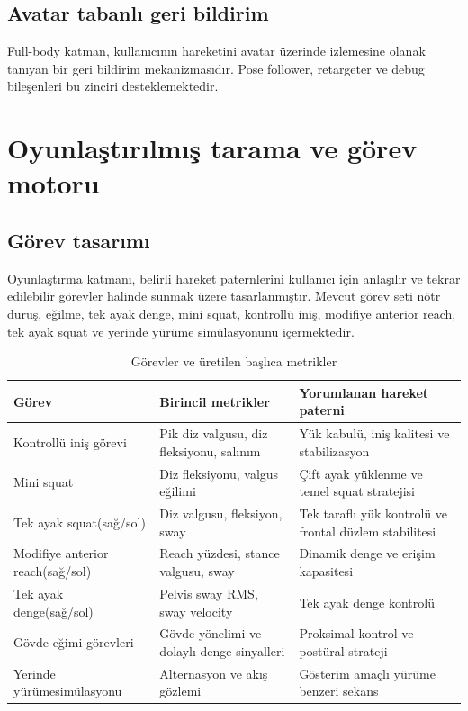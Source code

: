 \documentclass[12pt,a4paper,oneside]{report}
\begin{document}
\subsection{Avatar tabanlı geri bildirim}
Full-body katman, kullanıcının hareketini avatar üzerinde izlemesine olanak tanıyan bir geri bildirim mekanizmasıdır. Pose follower, retargeter ve debug bileşenleri bu zinciri desteklemektedir.

\section{Oyunlaştırılmış tarama ve görev motoru}

\subsection{Görev tasarımı}
Oyunlaştırma katmanı, belirli hareket paternlerini kullanıcı için anlaşılır ve tekrar edilebilir görevler halinde sunmak üzere tasarlanmıştır. Mevcut görev seti nötr duruş, eğilme, tek ayak denge, mini squat, kontrollü iniş, modifiye anterior reach, tek ayak squat ve yerinde yürüme simülasyonunu içermektedir.

\begin{table}[H]
\centering
\caption{Görevler ve üretilen başlıca metrikler}
\label{tab:gorevler}
\renewcommand{\arraystretch}{1.2}
\small
\begin{tabularx}{\textwidth}{L{3.6cm}L{4.2cm}Y}
\toprule
\textbf{Görev} & \textbf{Birincil metrikler} & \textbf{Yorumlanan hareket paterni} \\
\midrule
Kontrollü iniş görevi & Pik diz valgusu, diz fleksiyonu, salınım & Yük kabulü, iniş kalitesi ve stabilizasyon \\
Mini squat & Diz fleksiyonu, valgus eğilimi & Çift ayak yüklenme ve temel squat stratejisi \\
Tek ayak squat\newline (sağ/sol) & Diz valgusu, fleksiyon, sway & Tek taraflı yük kontrolü ve frontal düzlem stabilitesi \\
Modifiye anterior reach\newline (sağ/sol) & Reach yüzdesi, stance valgusu, sway & Dinamik denge ve erişim kapasitesi \\
Tek ayak denge\newline (sağ/sol) & Pelvis sway RMS, sway velocity & Tek ayak denge kontrolü \\
Gövde eğimi görevleri & Gövde yönelimi ve dolaylı denge sinyalleri & Proksimal kontrol ve postüral strateji \\
Yerinde yürüme\newline simülasyonu & Alternasyon ve akış gözlemi & Gösterim amaçlı yürüme benzeri sekans \\
\bottomrule
\end{tabularx}
\end{table}
\normalsize
\end{document}
